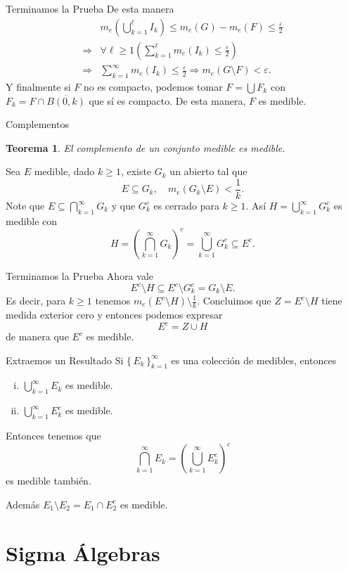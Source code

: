 \documentclass[utf8]{beamer}
\theoremstyle{plain}
\newtheorem{Th}{Teorema}               %
\theoremstyle{definition}
\theoremstyle{remark}
\numberwithin{equation}{section}
\newcommand{\eps}{\varepsilon}          %
\newcommand{\set}[1]{\{\,#1\,\}}    %
\renewcommand{\geq}{\geqslant}          %
\renewcommand{\l}{\ell}                   %
\renewcommand{\leq}{\leqslant}          %
\newcommand{\less}{\setminus}           %
\newcommand{\To}{\Rightarrow}
\newcommand{\ov}{\overline}
\newcommand{\suck}{_{k=1}^\infty} %
\renewcommand{\.}{\Cdot}                %
\begin{document}
\begin{frame}{Terminamos la Prueba}
  De esta manera 
  \begin{align*}
    &m_e\left(\bigcup_{k=1}^\l I_k\right)\leq m_e(G)-m_e(F)\leq \frac{\eps}{2}\\
    \To&\forall \l\geq 1\left(\sum_{k=1}^\l m_e(I_k)\leq \frac{\eps}{2}\right)\\
    \To&\sum\suck m_e(I_k)\leq\frac\eps2\To m_e(G\less F)<\eps.
  \end{align*}
  Y finalmente si $F$ no es compacto, podemos tomar $F=\bigcup F_k$ con $F_k=F\cap\ov{B(0,k)}$ que sí es compacto. De esta manera, $F$ es medible.
\end{frame}

\begin{frame}{Complementos}
  \begin{Th}\label{th:complementMeasurable}
    El complemento de un conjunto medible es medible.
  \end{Th}
  Sea $E$ medible, dado $k\geq 1$, existe $G_k$ un abierto tal que 
  $$E\subseteq G_k,\quad m_e(G_k\less E)<\frac1k.$$
  Note que $E\subseteq\bigcap\suck G_k$ y que $G_k^c$ es cerrado para $k\geq 1$. Así $H=\bigcup\suck G_k^c$ es medible con 
  $$H=\left(\bigcap\suck G_k\right)^c=\bigcup\suck G_k^c\subseteq E^c.$$
\end{frame}

\begin{frame}{Terminamos la Prueba}
  Ahora vale 
  $$E^c\less H\subseteq E^c\less G_k^c=G_k\less E.$$
  Es decir, para $k\geq 1$ tenemos $m_e(E^c\less H)\less \frac1k$. Concluimos que $Z=E^c\less H$ tiene medida exterior cero y entonces podemos expresar 
  $$E^c=Z\cup H$$
  de manera que $E^c$ es medible.
\end{frame}

\begin{frame}{Extraemos un Resultado}
  Si $\set{E_k}\suck$ es una colección de medibles, entonces 
  \begin{enumerate}[(i)]
    \item $\bigcup\suck E_k$ es medible.
    \item $\bigcup\suck E_k^c$ es medible.
  \end{enumerate}
  Entonces tenemos que 
  $$\bigcap\suck E_k=\left(\bigcup\suck E_k^c\right)^c$$
  es medible también.\par 
  Además $E_1\less E_2=E_1\cap E_2^c$ es medible.
\end{frame}

\section{Sigma Álgebras}
\end{document}
